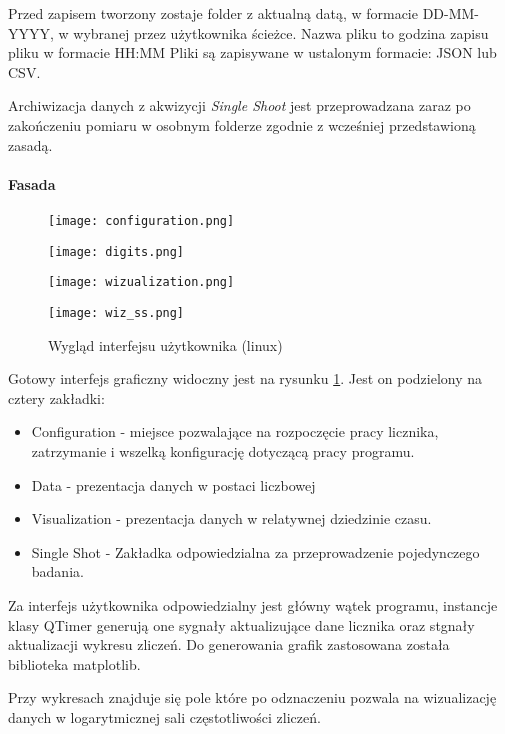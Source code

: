 Przed zapisem tworzony zostaje folder z aktualną datą, w formacie DD-MM-YYYY, w wybranej przez użytkownika ścieżce. Nazwa pliku to godzina zapisu pliku w formacie HH:MM
Pliki są zapisywane w ustalonym formacie: JSON lub CSV.

Archiwizacja danych z akwizycji \textit{Single Shoot} jest przeprowadzana zaraz po zakończeniu pomiaru w osobnym folderze zgodnie z wcześniej przedstawioną zasadą. 

\paragraph{Fasada}
\begin{figure}
        \begin{multicols}{2}
        
        \texttt{[image: configuration.png]}\par
        
        
        \texttt{[image: digits.png]}\par
        
        
        \end{multicols}\hfill
        
        \begin{multicols}{2}
        
        
        \texttt{[image: wizualization.png]}\par
        
        
        \texttt{[image: wiz\_ss.png]}\par
        
        \end{multicols}
        \caption{Wygląd interfejsu użytkownika (linux)}
        \label{Gui pic}
        \end{figure}

Gotowy interfejs graficzny widoczny jest na rysunku \ref{Gui pic}. Jest on podzielony na cztery zakładki:
\begin{itemize}
        \item Configuration - miejsce pozwalające na rozpoczęcie pracy licznika, zatrzymanie i wszelką konfigurację dotyczącą pracy programu. 
        \item Data - prezentacja danych w postaci liczbowej 
        \item Visualization - prezentacja danych w relatywnej dziedzinie czasu. 
        \item Single Shot - Zakładka odpowiedzialna za przeprowadzenie pojedynczego badania.
\end{itemize}

Za interfejs użytkownika odpowiedzialny jest główny wątek programu, instancje klasy QTimer\cite{doc pyqt} generują one sygnały aktualizujące dane licznika oraz stgnały aktualizacji wykresu zliczeń. 
Do generowania grafik zastosowana została biblioteka matplotlib\cite{doc matplotlib}. 

Przy wykresach znajduje się pole które po odznaczeniu pozwala na wizualizację danych w logarytmicznej sali częstotliwości zliczeń.
